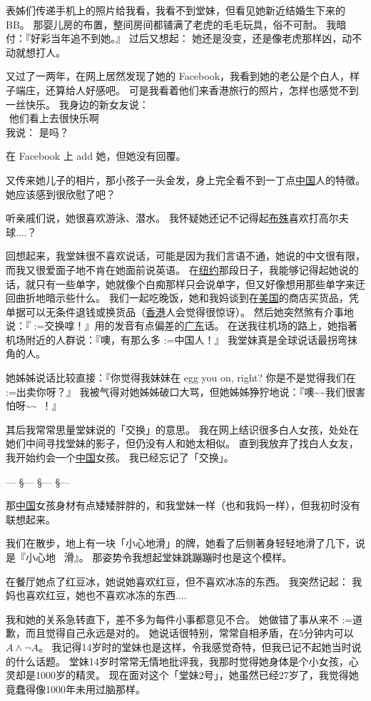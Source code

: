 \documentclass[12pt]{report}
\makeatletter
\newcommand{\tab}{\hspace*{1cm}}
\renewcommand{\d}[1]{$\underaccent{\scalebox{0.5}{\textbullet}}{\textrm{#1}}$}
\newcommand{\ds}[1]{%
  \@tfor\next:=#1\do{\d{\next}}}
\newcommand*\vignette{\begin{center}\color{blue}  --- \quad \S \quad --- \quad \S \quad --- \quad \S \quad --- \end{center}}
\newcommand*\dashh{\textemdash\,\,}
\makeatother
\begin{document}
表姊们传递手机上的照片给我看，我看不到堂妹，但看见她新近结婚生下来的BB。 那婴儿房的布置，整间房间都铺满了老虎的毛毛玩具，俗不可耐。 我暗付：『好彩当年追不到她。』  过后又想起： 她还是没变，还是像老虎那样凶，动不动就想打人。

又过了一两年，在网上居然发现了她的 Facebook，我看到她的老公是个白人，样子端庄，还算给人好感吧。 可是我看着他们来香港旅行的照片，怎样也感觉不到一丝快乐。 我身边的新女友说：\\
\tab \dashh 他们看上去很快乐啊 \\
\tab 我说： 是吗？

在 Facebook 上 add 她，但她没有回覆。

又传来她儿子的相片，那小孩子一头金发，身上完全看不到一丁点\underline{中国}人的特徵。 她应该感到很欣慰了吧？

听亲戚们说，她很喜欢游泳、潜水。  我怀疑她还记不记得起\underline{布殊}喜欢打高尔夫球....？

回想起来，我堂妹很不喜欢说话，可能是因为我们言语不通，她说的中文很有限，而我又很爱面子地不肯在她面前说英语。 在\underline{纽约}那段日子，我能够记得起她说的话，就只有一些单字，她就像个白痴那样只会说单字，但又好像想用那些单字来迂回曲折地暗示些什么。 我们一起吃晚饭，她和我妈谈到在\underline{美国}的商店买货品，凭单据可以无条件退钱或换货品（\underline{香港}人会觉得很惊讶）。 然后她突然煞有介事地说：『\ds{交换}嗱！』用的发音有点偏差的\underline{广东}话。 在送我往机场的路上，她指著机场附近的人群说：『噢，有那么多\ds{中国人}！』  我堂妹真是全球说话最拐弯抹角的人。

她姊姊说话比较直接：『你觉得我妹妹在 egg you on, right?  你是不是觉得我们在\ds{出卖}你呀？』  我被气得对她姊姊破口大骂，但她姊姊狰狞地说：『噢\textasciitilde\textasciitilde 我们很害怕呀\textasciitilde\textasciitilde ~！』

其后我常常思量堂妹说的「交换」的意思。 我在网上结识很多白人女孩，处处在她们中间寻找堂妹的影子，但仍没有人和她太相似。 直到我放弃了找白人女友，我开始约会一个\underline{中国}女孩。 我已经忘记了「交换」。

\vignette

那\underline{中国}女孩身材有点矮矮胖胖的，和我堂妹一样（也和我妈一样），但我初时没有联想起来。

我们在散步，地上有一块「小心地滑」的牌，她看了后侧著身轻轻地滑了几下，说是『小心地 ~滑』。 那姿势令我想起堂妹跳蹦蹦时也是这个模样。

在餐厅她点了红豆冰，她说她喜欢红豆，但不喜欢冰冻的东西。  我突然记起： 我妈也喜欢红豆，她也不喜欢冰冻的东西....

我和她的关系急转直下，差不多为每件小事都意见不合。 她做错了事从来不\ds{道歉}，而且觉得自己永远是对的。 她说话很特别，常常自相矛盾，在5分钟内可以 $A \wedge \neg A$。  我记得14岁时的堂妹也是这样，令我感觉奇特，但我已记不起她当时说的什么话题。  堂妹14岁时常常无情地批评我，我那时觉得她身体是个小女孩，心灵却是1000岁的精灵。  现在面对这个「堂妹2号」，她虽然已经27岁了，我觉得她竟蠢得像1000年未用过脑那样。%
\end{document}
